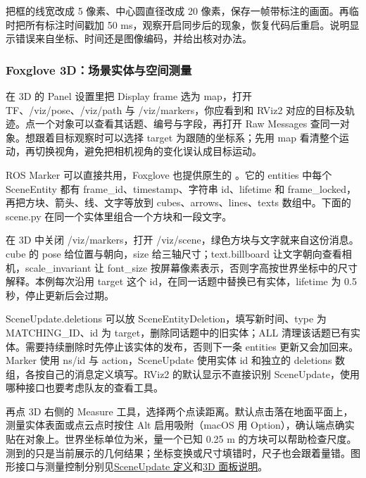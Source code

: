 \begin{exercise}\label{ex:v2-ros-image-annotations}
把框的线宽改成 5 像素、中心圆直径改成 20 像素，保存一帧带标注的画面。再临时把所有标注时间戳加 50 ms，观察开启同步后的现象，恢复代码后重启。说明显示错误来自坐标、时间还是图像编码，并给出核对办法。
\end{exercise}

\subsubsection{Foxglove 3D：场景实体与空间测量}
\label{sec:ros2-foxglove-3d}

在 3D 的 Panel 设置里把 Display frame 选为 map，打开 TF、/viz/pose、/viz/path 与 /viz/markers，你应看到和 RViz2 对应的目标及轨迹。点一个对象可以查看其话题、编号与字段，再打开 Raw Messages 查同一对象。想跟着目标观察时可以选择 target 为跟随的坐标系；先用 map 看清整个运动，再切换视角，避免把相机视角的变化误认成目标运动。

\begin{example}
ROS Marker 可以直接共用，Foxglove 也提供原生的 。它的 entities 中每个 SceneEntity 都有 frame\_id、timestamp、字符串 id、lifetime 和 frame\_locked，再把方块、箭头、线、文字等放到 cubes、arrows、lines、texts 数组中。下面的 scene.py 在同一个实体里组合一个方块和一段文字。


在 3D 中关闭 /viz/markers，打开 /viz/scene，绿色方块与文字就来自这份消息。cube 的 pose 给位置与朝向，size 给三轴尺寸；text.billboard 让文字朝向查看相机，scale\_invariant 让 font\_size 按屏幕像素表示，否则字高按世界坐标中的尺寸解释。本例每次沿用 target 这个 id，在同一话题中替换已有实体，lifetime 为 0.5 秒，停止更新后会过期。

SceneUpdate.deletions 可以放 SceneEntityDeletion，填写新时间、type 为 MATCHING\_ID、id 为 target，删除同话题中的旧实体；ALL 清理该话题已有实体。需要持续删除时先停止该实体的发布，否则下一条 entities 更新又会加回来。Marker 使用 ns/id 与 action，SceneUpdate 使用实体 id 和独立的 deletions 数组，各按自己的消息定义填写。RViz2 的默认显示不直接识别 SceneUpdate，使用哪种接口也要考虑队友的查看工具。

再点 3D 右侧的 Measure 工具，选择两个点读距离。默认点击落在地面平面上，测量实体表面或点云点时按住 Alt 启用吸附（macOS 用 Option），确认端点确实贴在对象上。世界坐标单位为米，量一个已知 0.25 m 的方块可以帮助检查尺度。测到的只是当前展示的几何结果；坐标变换或尺寸填错时，尺子也会跟着量错。图形接口与测量控制分别见\href{https://docs.foxglove.dev/docs/sdk/schemas/scene-update}{SceneUpdate 定义}和\href{https://docs.foxglove.dev/docs/visualization/panels/3d}{3D 面板说明}。
\end{example}

